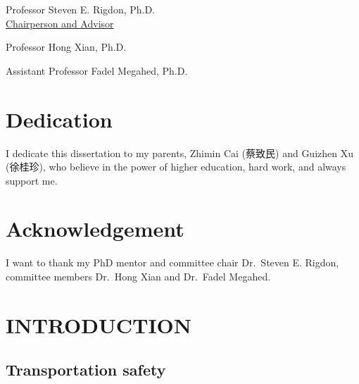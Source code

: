 \documentclass[12pt]{book}
\numberwithin{equation}{chapter}
\begin{document}
\vspace{.3cm}
Professor Steven E. Rigdon, Ph.D.\\
{\setlength{\parindent}{20ex}  \indent \underline{Chairperson and Advisor}}

\vspace{.3cm}
Professor Hong Xian, Ph.D.

\vspace{.3cm}
Assistant Professor Fadel Megahed, Ph.D.
\vspace*{\fill}








\hypertarget{dedication}{%
\chapter*{Dedication}\label{dedication}}

I dedicate this dissertation to my parents, Zhimin Cai (蔡致民) and Guizhen Xu (徐桂珍), who believe in the power of higher education, hard work, and always support me.

\hypertarget{acknowledgement}{%
\chapter*{Acknowledgement}\label{acknowledgement}}

I want to thank my PhD mentor and committee chair Dr.~Steven E. Rigdon, committee members Dr.~Hong Xian and Dr.~Fadel Megahed.

\linespread{1}
\cleardoublepage
\tableofcontents

\listoffigures
\listoftables

\mainmatter
\doublespacing

\hypertarget{introduction}{%
\chapter{INTRODUCTION}\label{introduction}}

\hypertarget{transportation-safety}{%
\section{Transportation safety}\label{transportation-safety}}
\end{document}
